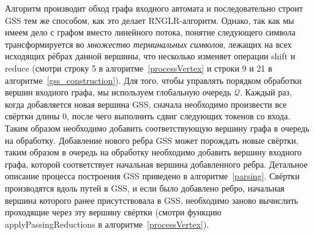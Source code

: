 Алгоритм производит обход графа входного автомата и последовательно строит GSS тем же способом, как это делает RNGLR-алгоритм. Однако, так как мы имеем дело с графом вместо линейного потока, понятие следующего символа трансформируется во \emph{множество терминальных символов}, лежащих на всех исходящих рёбрах данной вершины, что несколько изменяет операции shift и reduce (смотри строку 5 в алгоритме~\ref{processVertex} и строки 9 и 21 в алгоритме~\ref{gss_construction}). Для того, чтобы управлять порядком обработки вершин входного графа, мы используем глобальную очередь $\mathcal{Q}$. Каждый раз, когда добавляется новая вершина GSS, сначала необходимо произвести все свёртки длины 0, после чего выполнить сдвиг следующих токенов со входа. Таким образом необходимо добавить соответствующую вершину графа в очередь на обработку. Добавление нового ребра GSS может порождать новые свёртки, таким образом в очередь на обработку необходимо добавить вершину входного графа, которой соответствует начальная вершина добавленного ребра. Детальное описание процесса построения GSS приведено в алгоритме~\ref{parsing}. Свёртки производятся вдоль путей в GSS, и если было добавлено ребро, начальная вершина которого ранее присутствовала в GSS, необходимо заново вычислить проходящие через эту вершину свёртки (смотри функцию applyPassingReductions в алгоритме~\ref{processVertex}).

